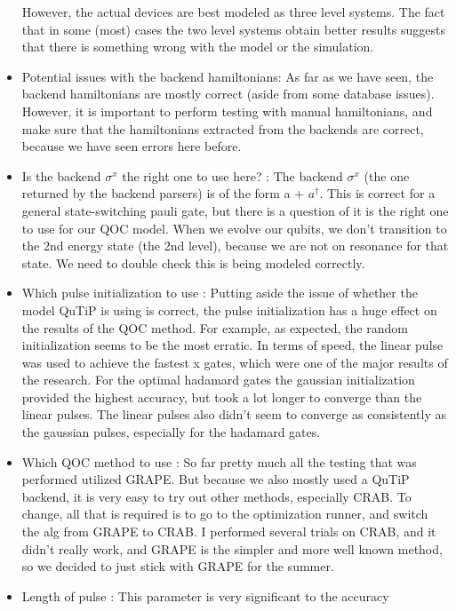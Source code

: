 \documentclass[12pt]{article}
\begin{document}
\begin{itemize}
    However, the actual devices are best modeled as three level systems. The
    fact that in some (most) cases the two level systems obtain better results
    suggests that there is something wrong with the model or the simulation. 
    \item Potential issues with the backend hamiltonians: As far as we have
    seen, the backend hamiltonians are mostly correct (aside from some database
    issues). However, it is important to perform testing with manual
    hamiltonians, and make sure that the hamiltonians extracted from the
    backends are correct, because we have seen errors here before.
    \item Is the backend $\sigma^x$ the right one to use here? : The backend
    $\sigma^x$ (the one returned by the backend parsers) is of the form a +
    $a^\dag$. This is correct for a general state-switching pauli gate, but
    there is a question of it is the right one to use for our QOC model. When we
    evolve our qubits, we don't transition to the 2nd energy state (the 2nd
    level), because we are not on resonance for that state. We need to double
    check this is being modeled correctly.
    \item Which pulse initialization to use : Putting aside the issue of whether
    the model QuTiP is using is correct, the pulse initialization has a huge
    effect on the results of the QOC method. For example, as expected, the
    random initialization seems to be the most erratic. In terms of speed, the
    linear pulse was used to achieve the fastest x gates, which were one of the
    major results of the research. For the optimal hadamard gates the gaussian
    initialization provided the highest accuracy, but took a lot longer to
    converge than the linear pulses. The linear pulses also didn't seem to
    converge as consistently as the gaussian pulses, especially for the hadamard
    gates.
    \item Which QOC method to use : So far pretty much all the testing that was
    performed utilized GRAPE. But because we also mostly used a QuTiP backend,
    it is very easy to try out other methods, especially CRAB. To change, all
    that is required is to go to the optimization runner, and switch the alg
    from GRAPE to CRAB. I performed several trials on CRAB, and it didn't really
    work, and GRAPE is the simpler and more well known method, so we decided to
    just stick with GRAPE for the summer.
    \item Length of pulse : This parameter is very significant to the accuracy

\end{itemize}
\end{document}
